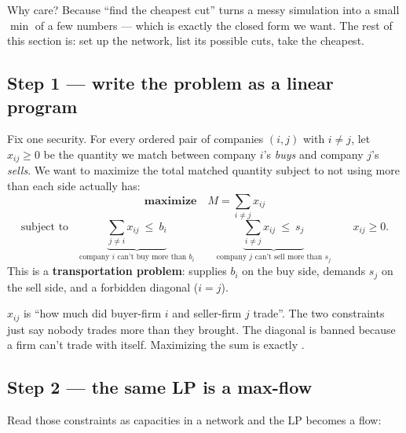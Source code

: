 \begin{intu}
Why care? Because ``find the cheapest cut'' turns a messy simulation into a
small $\min$ of a few numbers --- which is exactly the closed form we want. The
rest of this section is: set up the network, list its possible cuts, take the
cheapest.
\end{intu}

\subsection{Step 1 --- write the problem as a linear program}

Fix one security. For every ordered pair of companies $(i,j)$ with $i\neq j$, let
$x_{ij}\ge 0$ be the quantity we match between company $i$'s \emph{buys} and
company $j$'s \emph{sells}. We want to maximize the total matched quantity subject
to not using more than each side actually has:
\[
\textbf{maximize}\quad M=\sum_{i\neq j} x_{ij}
\]
\[
\text{subject to}\quad
\underbrace{\sum_{j\neq i} x_{ij}\ \le\ b_i}_{\text{company }i\text{ can't buy more than }b_i}
\qquad
\underbrace{\sum_{i\neq j} x_{ij}\ \le\ s_j}_{\text{company }j\text{ can't sell more than }s_j}
\qquad x_{ij}\ge 0 .
\]
This is a \textbf{transportation problem}: supplies $b_i$ on the buy side,
demands $s_j$ on the sell side, and a forbidden diagonal ($i=j$).

\begin{intu}
$x_{ij}$ is ``how much did buyer-firm $i$ and seller-firm $j$ trade''. The two
constraints just say nobody trades more than they brought. The diagonal is banned
because a firm can't trade with itself. Maximizing the sum is exactly
.
\end{intu}

\subsection{Step 2 --- the same LP is a max-flow}

Read those constraints as capacities in a network and the LP becomes a flow:

